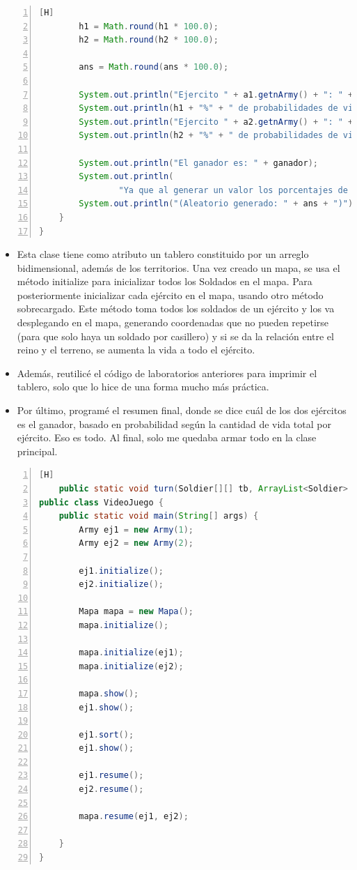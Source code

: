 \documentclass{article}
\begin{document}
\begin{lstlisting}[language=java,caption={Clase Mapa}, numbers=left][H]
        h1 = Math.round(h1 * 100.0);
        h2 = Math.round(h2 * 100.0);

        ans = Math.round(ans * 100.0);

        System.out.println("Ejercito " + a1.getnArmy() + ": " + a1.getReino() + ": " + a1.totalHP());
        System.out.println(h1 + "%" + " de probabilidades de victoria");
        System.out.println("Ejercito " + a2.getnArmy() + ": " + a2.getReino() + ": " + a2.totalHP());
        System.out.println(h2 + "%" + " de probabilidades de victoria");

        System.out.println("El ganador es: " + ganador);
        System.out.println(
                "Ya que al generar un valor los porcentajes de probabilidad de victoria basada en los niveles\nde vida de sus soldados y aplicando un experimento aleatorio salio vencedor.");
        System.out.println("(Aleatorio generado: " + ans + ")");
    }
}

	\end{lstlisting}
	\begin{itemize}	
		\item Esta clase tiene como atributo un tablero constituido por un arreglo bidimensional, además de los territorios. Una vez creado un mapa, se usa el método initialize para inicializar todos los Soldados en el mapa. Para posteriormente inicializar cada ejército en el mapa, usando otro método sobrecargado. Este método toma todos los soldados de un ejército y los va desplegando en el mapa, generando coordenadas que no pueden repetirse (para que solo haya un soldado por casillero) y si se da la relación entre el reino y el terreno, se aumenta la vida a todo el ejército.
		\item Además, reutilicé el código de laboratorios anteriores para imprimir el tablero, solo que lo hice de una forma mucho más práctica.
		\item Por último, programé el resumen final, donde se dice cuál de los dos ejércitos es el ganador, basado en probabilidad según la cantidad de vida total por ejército. Eso es todo. Al final, solo me quedaba armar todo en la clase principal.
	\end{itemize}
	\begin{lstlisting}[language=java,caption={Clase Videojuego}, numbers=left][H]
	public static void turn(Soldier[][] tb, ArrayList<Soldier> a, int[] c, int id) {
public class VideoJuego {
    public static void main(String[] args) {
        Army ej1 = new Army(1);
        Army ej2 = new Army(2);

        ej1.initialize();
        ej2.initialize();

        Mapa mapa = new Mapa();
        mapa.initialize();

        mapa.initialize(ej1);
        mapa.initialize(ej2);

        mapa.show();
        ej1.show();

        ej1.sort();
        ej1.show();

        ej1.resume();
        ej2.resume();

        mapa.resume(ej1, ej2);

    }
}

	\end{lstlisting}	
\end{document}
